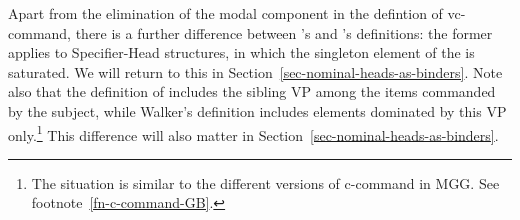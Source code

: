 \documentclass[output=paper,biblatex,babelshorthands,newtxmath,draftmode,colorlinks,citecolor=brown]{langscibook}
\begin{document}

Apart from the elimination of the modal component in the defintion of vc-command, there is a further
difference between \citeauthor{HL95b}'s and \citeauthor{Walker2011a}'s definitions: the former
applies to Specifier-Head structures, in which the singleton element of the \sprl is saturated. We
will return to this in Section~\ref{sec-nominal-heads-as-binders}. Note also that the definition of
\citeauthor{HL95b} includes the sibling VP among the items commanded by the subject, while Walker's
definition includes elements dominated by this VP only.\footnote{%
  The situation is similar to the different versions of c-command in MGG. See footnote~\ref{fn-c-command-GB}.
}
This difference will also matter in Section~\ref{sec-nominal-heads-as-binders}.
\end{document}
